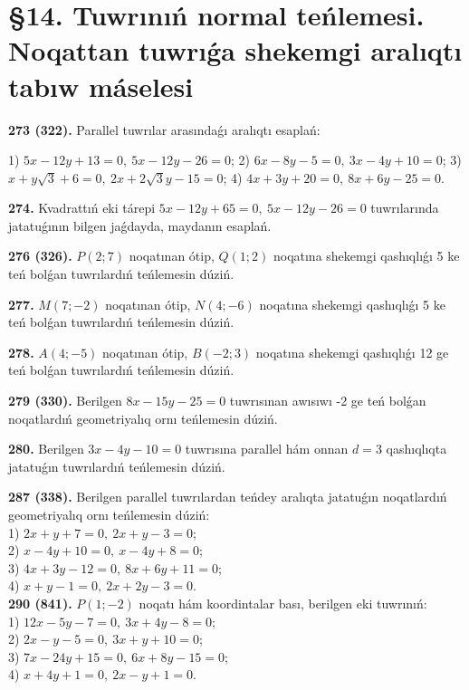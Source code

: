 \documentclass{article}
\begin{document}
\section*{\S 14. Tuwrınıń normal teńlemesi. Noqattan tuwrıǵa shekemgi aralıqtı 
tabıw máselesi}

\textbf{273 (322).} Parallel tuwrılar arasındaǵı aralıqtı esaplań:

1) $5x-12y+13=0,\ 5x-12y-26=0$;
2) $6x-8y-5=0,\ 3x-4y+10=0$;
3) $x+y\sqrt{3}+6=0,\ 2x+2\sqrt{3}y-15=0$;
4) $4x+3y+20=0,\ 8x+6y-25=0$.

\textbf{274.} Kvadrattıń eki tárepi
\(5x-12y+65=0,\ 5x-12y-26=0\) tuwrılarında
jatatuǵının bilgen jaǵdayda, maydanın esaplań.


\textbf{276 (326).} \(P(2;7)\) noqatınan ótip, \(Q(1;2)\) noqatına shekemgi
qashıqlıǵı 5 ke teń bolǵan tuwrılardıń teńlemesin dúziń.

\textbf{277.} \(M(7;-2)\) noqatınan ótip, \(N(4;-6)\) noqatına
shekemgi qashıqlıǵı 5 ke teń bolǵan tuwrılardıń teńlemesin dúziń.

\textbf{278.} \(A(4;-5)\) noqatınan ótip, \(B(-2;3)\) noqatına
shekemgi qashıqlıǵı 12 ge teń bolǵan tuwrılardıń teńlemesin dúziń.

\textbf{279 (330).} Berilgen \(8x-15y-25=0\) tuwrısınan awısıwı -2 ge
teń bolǵan noqatlardıń geometriyalıq ornı teńlemesin dúziń.

\textbf{280.} Berilgen \(3x-4y-10=0\) tuwrısına parallel hám onnan
$d=3$ qashıqlıqta jatatuǵın tuwrılardıń teńlemesin dúziń.

\textbf{287 (338).} Berilgen parallel tuwrılardan teńdey aralıqta jatatuǵın
noqatlardıń geometriyalıq ornı teńlemesin dúziń:\\

1) $2x+y+7=0,\ 2x+y-3=0$; \\
2) $x-4y+10=0,\ x-4y+8=0$; \\
3) $4x+3y-12=0,\ 8x+6y+11=0$; \\
4) $x+y-1=0,\ 2x+2y-3=0$. \\

\textbf{290 (841).} \(P(1;-2)\) noqatı hám koordintalar bası, berilgen eki
tuwrınıń:\\

1) $12x-5y-7=0,\ 3x+4y-8=0$; \\
2) $2x-y-5=0,\ 3x+y+10=0$; \\
3) $7x-24y+15=0,\ 6x+8y-15=0$; \\
4) $x+4y+1=0,\ 2x-y+1=0$. \\
\end{document}
